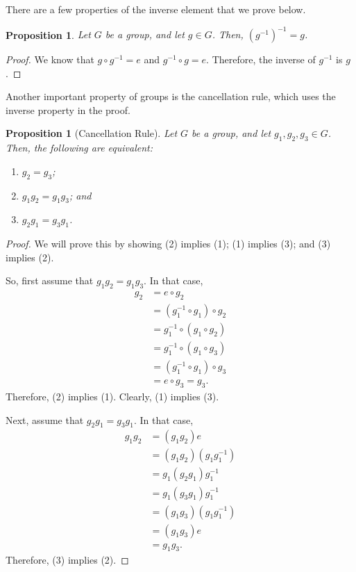 \documentclass[a4paper, openany]{memoir}
\theoremstyle{definition}
\theoremstyle{plain}
\newtheorem{proposition}[definition]{Proposition}
\begin{document}
There are a few properties of the inverse element that we prove below.
\begin{proposition}
Let $G$ be a group, and let $g \in G$. Then, $(g^{-1})^{-1} = g$.
\end{proposition}
\begin{proof}
We know that $g \circ g^{-1} = e$ and $g^{-1} \circ g = e$. Therefore, the inverse of $g^{-1}$ is $g$.
\end{proof}
\noindent Another important property of groups is the cancellation rule, which uses the inverse property in the proof.
\begin{proposition}[Cancellation Rule]
Let $G$ be a group, and let $g_1, g_2, g_3 \in G$. Then, the following are equivalent:
\begin{enumerate}[label=(\arabic*)]
    \item $g_2 = g_3$;
    \item $g_1g_2 = g_1g_3$; and
    \item $g_2g_1 = g_3g_1$.
\end{enumerate}
\end{proposition}
\begin{proof}
We will prove this by showing (2) implies (1); (1) implies (3); and (3) implies (2).

\noindent So, first assume that $g_1g_2 = g_1g_3$. In that case,
\begin{align*}
    g_2 &= e \circ g_2 \\
    &= (g_1^{-1} \circ g_1) \circ g_2 \\
    &= g_1^{-1} \circ (g_1 \circ g_2) \\
    &= g_1^{-1} \circ (g_1 \circ g_3) \\
    &= (g_1^{-1} \circ g_1) \circ g_3 \\
    &= e \circ g_3 = g_3.
\end{align*}
Therefore, (2) implies (1). Clearly, (1) implies (3).

\noindent Next, assume that $g_2g_1 = g_3g_1$. In that case,
\begin{align*}
    g_1g_2 &= (g_1g_2) e \\
    &= (g_1g_2)(g_1g_1^{-1}) \\
    &= g_1 (g_2g_1) g_1^{-1} \\
    &= g_1 (g_3g_1) g_1^{-1} \\
    &= (g_1g_3) (g_1g_1^{-1}) \\
    &= (g_1g_3) e \\
    &= g_1g_3.
\end{align*}
Therefore, (3) implies (2).
\end{proof}
\end{document}
